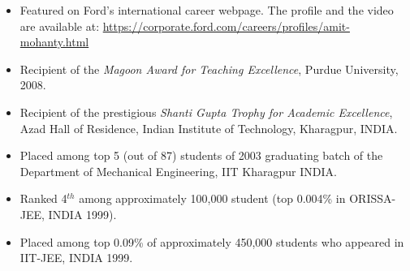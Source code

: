\documentclass[letterpaper,11pt]{article}
\newcommand{\resumeSubHeadingListStart}{\begin{itemize}[leftmargin=*]}
\newcommand{\resumeSubHeadingListEnd}{\end{itemize}}
\begin{document}
\begin{itemize}\setlength{\itemsep}{0pt}
\item Featured on Ford's international career webpage. The profile and the video are available at:
\url{https://corporate.ford.com/careers/profiles/amit-mohanty.html}
\item Recipient of the  \emph{Magoon Award for Teaching Excellence},
Purdue University, 2008.
\item Recipient of the prestigious \emph{Shanti Gupta Trophy for
Academic Excellence}, Azad Hall of Residence, Indian Institute of
Technology, Kharagpur, INDIA.
\item Placed among top 5 (out of 87) students of 2003 graduating batch
of the  Department of Mechanical Engineering, IIT Kharagpur INDIA.
\item Ranked 4$^{th}$ among approximately 100,000 student (top 0.004\%
 in ORISSA-JEE, INDIA 1999).
\item Placed among top 0.09\% of approximately 450,000 students who
appeared in IIT-JEE, INDIA 1999.
\end{itemize}


%


\end{document}
